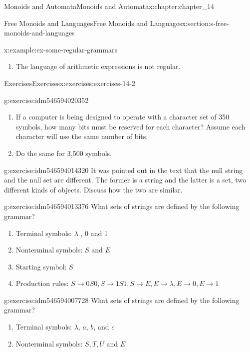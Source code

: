 \documentclass[oneside,10pt,]{book}
\numberwithin{equation}{section}
\begin{document}
\begin{chapterptx}{Monoids and Automata}{}{Monoids and Automata}{}{}{x:chapter:chapter_14}
\begin{sectionptx}{Free Monoids and Languages}{}{Free Monoids and Languages}{}{}{x:section:s-free-monoids-and-languages}
\begin{example}{}{x:example:ex-some-regular-grammars}
\begin{enumerate}[label=(\alph*)]
\item{}The language of arithmetic expressions is not regular.%
\end{enumerate}
%
\end{example}
%
%
\typeout{************************************************}
\typeout{************************************************}
%
\begin{exercises-subsection}{Exercises}{}{Exercises}{}{}{x:exercises:exercises-14-2}
\begin{divisionexercise}{1}{}{}{g:exercise:idm546594020352}%
%
\begin{enumerate}[label=(\alph*)]
\item{}If a computer is being designed to operate with a character set of 350 symbols, how many bits must be reserved for each character? Assume each character will use the same number of bits.%
\item{}Do the same for 3,500 symbols.%
\end{enumerate}
%
\end{divisionexercise}%
\begin{divisionexercise}{2}{}{}{g:exercise:idm546594014320}%
It was pointed out in the text that the null string and the null set are different. The former is a string and the latter is a set, two different kinds of objects. Discuss how the two are similar.%
\end{divisionexercise}%
\begin{divisionexercise}{3}{}{}{g:exercise:idm546594013376}%
What sets of strings are defined by the following grammar?%
\begin{enumerate}[label=(\alph*)]
\item{}Terminal symbols: \(\lambda\) , 0 and 1%
\item{}Nonterminal symbols: \(S\) and \(E\)%
\item{}Starting symbol: \(S\)%
\item{}Production rules: \(S\to 0S0, S \to 1S1, S\to E, E \to \lambda, E\to 0, E\to 1\)%
\end{enumerate}
%
\end{divisionexercise}%
\begin{divisionexercise}{4}{}{}{g:exercise:idm546594007728}%
What sets of strings are defined by the following grammar?%
\begin{enumerate}[label=(\alph*)]
\item{}Terminal symbols: \(\lambda\), \(a\), \(b\), and \(c\)%
\item{}Nonterminal symbols: \(S, T, U \textrm{ and } E\)%

\end{enumerate}
\end{divisionexercise}
\end{exercises-subsection}
\end{sectionptx}
\end{chapterptx}
\end{document}
